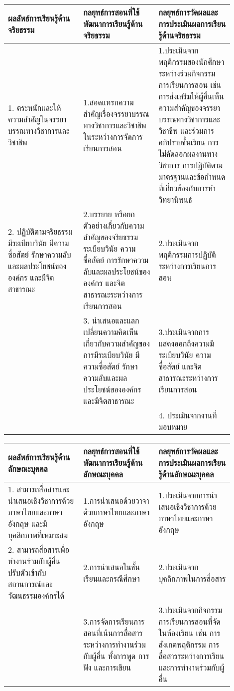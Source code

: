 \begin{landscape}
 
 \par\noindent\bigskip
 \renewcommand{\arraystretch}{1.3}
 \begin{tabular}{|p{0.3\linewidth}|p{0.3\linewidth}|p{0.3\linewidth}|}
\hline
\textbf{ผลลัพธ์การเรียนรู้ด้านจริยธรรม} & \textbf{กลยุทธ์การสอนที่ใช้พัฒนาการเรียนรู้ด้านจริยธรรม} & \textbf{กลยุทธ์การวัดผลและการประเมินผลการเรียนรู้ด้านจริยธรรม} \\
\hline 
1. ตระหนักและให้ความสำคัญในจรรยาบรรณทางวิชาการและวิชาชีพ & 1.สอดแทรกความสำคัญเรื่องจรรยาบรรณทางวิชาการและวิชาชีพในระหว่างการจัดการเรียนการสอน & 1.ประเมินจากพฤติกรรมของนักศึกษาระหว่างร่วมกิจกรรมการเรียนการสอน เช่น การส่งเสริมให้ผู้อื่นเห็นความสำคัญของจรรยาบรรณทางวิชาการและวิชาชีพ และร่วมการอภิปรายชั้นเรียน การไม่คัดลอกผลงานทางวิชาการ การปฏิบัติตามมาตรฐานและข้อกำหนดที่เกี่ยวข้องกับการทำวิทยานิพนธ์ \\ \hline
2. ปฏิบัติตามจริยธรรม มีระเบียบวินัย มีความซื่อสัตย์ รักษาความลับและผลประโยชน์ขององค์กร และมีจิตสาธารณะ & 2.บรรยาย หรือยกตัวอย่างเกี่ยวกับความสำคัญของจริยธรรม ระเบียบวินัย ความซื่อสัตย์ การรักษาความลับและผลประโยชน์ขององค์กร และจิตสาธารณะระหว่างการเรียนการสอน & 2.ประเมินจากพฤติกรรมการปฏิบัติระหว่างการเรียนการสอน \\ \hline
 & 3. นำเสนอและแลกเปลี่ยนความคิดเห็นเกี่ยวกับความสำคัญของการมีระเบียบวินัย มีความซื่อสัตย์ รักษาความลับและผลประโยชน์ขององค์กร และมีจิตสาธารณะ & 3.ประเมินจากการแสดงออกถึงความมีระเบียบวินัย ความซื่อสัตย์ และจิตสาธารณะระหว่างการเรียนการสอน \\ \hline
 &  & 4. ประเมินจากงานที่มอบหมาย \\ \hline
 \end{tabular}
 
 \par\noindent\bigskip
 \renewcommand{\arraystretch}{1.3}
 \begin{tabular}{|p{0.3\linewidth}|p{0.3\linewidth}|p{0.3\linewidth}|}
\hline
\textbf{ผลลัพธ์การเรียนรู้ด้านลักษณะบุคคล} & \textbf{กลยุทธ์การสอนที่ใช้พัฒนาการเรียนรู้ด้านลักษณะบุคคล} & \textbf{กลยุทธ์การวัดผลและการประเมินผลการเรียนรู้ด้านลักษณะบุคคล} \\
\hline 
1. สามารถสื่อสารและนำเสนอเชิงวิชาการด้วยภาษาไทยและภาษาอังกฤษ และมีบุคลิกภาพที่เหมาะสม & 1.การนำเสนอด้วยวาจาด้วยภาษาไทยและภาษาอังกฤษ & 1.ประเมินจากการนำเสนอเชิงวิชาการด้วยภาษาไทยและภาษาอังกฤษ \\ \hline
2. สามารถสื่อสารเพื่อทำงานร่วมกับผู้อื่น ปรับตัวเข้ากับสถานการณ์และวัฒนธรรมองค์กรได้ & 2.การนำเสนอในชั้นเรียนและกรณีศึกษา & 2.ประเมินจากบุคลิกภาพในการสื่อสาร \\ \hline
 & 3.การจัดการเรียนการสอนที่เน้นการสื่อสารระหว่างการทำงานร่วมกับผู้อื่น ทั้งการพูด การฟัง และการเขียน & 3.ประเมินจากกิจกรรมการเรียนการสอนที่จัดในห้องเรียน เช่น การสังเกตพฤติกรรม การสื่อสารระหว่างการเรียนและการทำงานร่วมกับผู้อื่น \\ \hline
 \end{tabular} 
 

\end{landscape}
